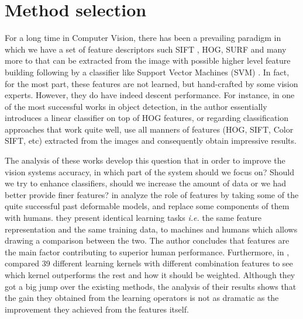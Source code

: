 

\section{Method selection}

For a long time in Computer Vision, there has been a prevailing paradigm in which we have a set of feature descriptors such SIFT \cite{lowe1999object}, HOG\cite{dalal2005histograms}, SURF\cite{bay2006surf} and many more to that can be extracted from the image with possible higher level feature building following by a classifier like Support Vector Machines (SVM) \cite{vapnik1964note, boser1992training}. In fact, for the most part, these features are not learned, but hand-crafted by some vision experts. However, they do have indeed descent performance. For instance, in one of the most successful works in object detection, in \cite{felzenszwalb2010object} the author essentially introduces a linear classifier on top of HOG features, or regarding classification approaches that work quite well, \citeauthor{yu2010object} use all manners of features (HOG, SIFT, Color SIFT, etc) extracted from the images and consequently obtain impressive results. 

\indent The analysis of these works develop this question that in order to improve the vision systems accuracy, in which part of the system should we focus on? Should we try to enhance classifiers, should we increase the amount of data or we had better provide finer features? \citeauthor*{parikh2010role} in \cite{parikh2010role} analyze the role of features by taking some of the quite successful past deformable models\cite{albrecht2015deformable}, and replace some components of them with humans. they present identical learning tasks \textit{i.e.} the same feature representation and the same training data, to machines and humans which allows drawing a comparison between the two. The author concludes that features are the main factor contributing to superior human performance. Furthermore, in \cite{gehler2009feature}, compared 39 different learning kernels with different combination features to see which kernel outperforms the rest and how it should be weighted. Although they got a big jump over the existing methods, the analysis of their results shows that the gain they obtained from the learning operators is not as dramatic as the improvement they achieved from the features itself. 

